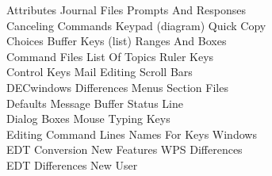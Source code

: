 \begin{tabbing}
    Attributes           \>  Journal Files        \> Prompts And Responses \\
    Canceling Commands   \>  Keypad (diagram)     \> Quick Copy            \\
    Choices Buffer       \>  Keys (list)          \> Ranges And Boxes      \\
    Command Files        \>  List Of Topics       \> Ruler Keys            \\
    Control Keys         \>  Mail Editing         \> Scroll Bars           \\
    DECwindows Differences\> Menus                \> Section Files         \\
    Defaults             \>  Message Buffer       \> Status Line           \\
    Dialog Boxes         \>  Mouse                \> Typing Keys           \\
    Editing Command Lines\>  Names For Keys       \> Windows               \\
    EDT Conversion       \>  New Features         \> WPS Differences       \\
    EDT Differences      \>  New User             \>                       \\
\end{tabbing}


